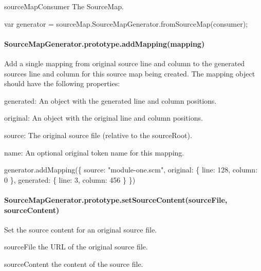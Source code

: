 \begin{DoxyItemize}
\item {\ttfamily source\+Map\+Consumer} The Source\+Map.
\end{DoxyItemize}


\begin{DoxyCode}
var generator = sourceMap.SourceMapGenerator.fromSourceMap(consumer);
\end{DoxyCode}


\paragraph*{Source\+Map\+Generator.\+prototype.\+add\+Mapping(mapping)}

Add a single mapping from original source line and column to the generated source\textquotesingle{}s line and column for this source map being created. The mapping object should have the following properties\+:


\begin{DoxyItemize}
\item {\ttfamily generated}\+: An object with the generated line and column positions.
\item {\ttfamily original}\+: An object with the original line and column positions.
\item {\ttfamily source}\+: The original source file (relative to the source\+Root).
\item {\ttfamily name}\+: An optional original token name for this mapping.
\end{DoxyItemize}


\begin{DoxyCode}
generator.addMapping(\{
  source: "module-one.scm",
  original: \{ line: 128, column: 0 \},
  generated: \{ line: 3, column: 456 \}
\})
\end{DoxyCode}


\paragraph*{Source\+Map\+Generator.\+prototype.\+set\+Source\+Content(source\+File, source\+Content)}

Set the source content for an original source file.


\begin{DoxyItemize}
\item {\ttfamily source\+File} the U\+RL of the original source file.
\item {\ttfamily source\+Content} the content of the source file.
\end{DoxyItemize}


